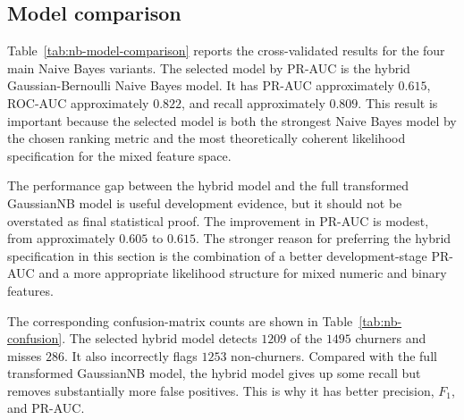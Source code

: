 \subsection{Model comparison}

Table~\ref{tab:nb-model-comparison} reports the cross-validated results for the four main Naive Bayes variants. The selected model by PR-AUC is the hybrid Gaussian-Bernoulli Naive Bayes model. It has PR-AUC approximately \(0.615\), ROC-AUC approximately \(0.822\), and recall approximately \(0.809\). This result is important because the selected model is both the strongest Naive Bayes model by the chosen ranking metric and the most theoretically coherent likelihood specification for the mixed feature space.

The performance gap between the hybrid model and the full transformed GaussianNB model is useful development evidence, but it should not be overstated as final statistical proof. The improvement in PR-AUC is modest, from approximately \(0.605\) to \(0.615\). The stronger reason for preferring the hybrid specification in this section is the combination of a better development-stage PR-AUC and a more appropriate likelihood structure for mixed numeric and binary features.

\begin{table}[H]
\centering
\small
{}
\caption{Cross-validated Naive Bayes model comparison on the training set}
\label{tab:nb-model-comparison}
\end{table}

The corresponding confusion-matrix counts are shown in Table~\ref{tab:nb-confusion}. The selected hybrid model detects \(1209\) of the \(1495\) churners and misses \(286\). It also incorrectly flags \(1253\) non-churners. Compared with the full transformed GaussianNB model, the hybrid model gives up some recall but removes substantially more false positives. This is why it has better precision, \(F_1\), and PR-AUC.

